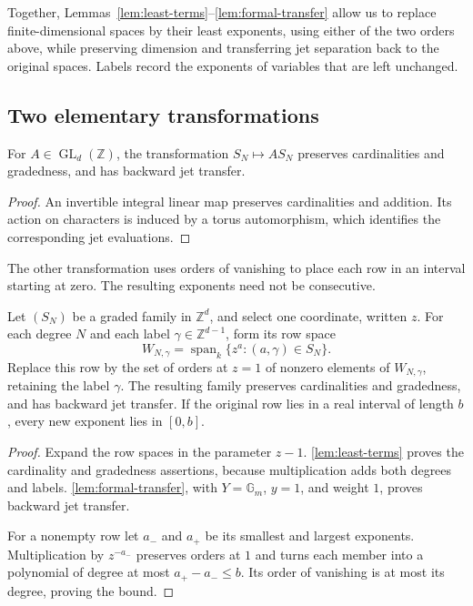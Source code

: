 Together, Lemmas~\ref{lem:least-terms}--\ref{lem:formal-transfer} allow us to replace finite-dimensional spaces by their least exponents, using either of the two orders above, while preserving dimension and transferring jet separation back to the original spaces.  Labels record the exponents of variables that are left unchanged.

\subsection{Two elementary transformations}

\begin{lemma}\label{lem:unimodular}
For $A\in\operatorname{GL}_d(\mathbb{Z})$, the transformation $S_N\mapsto A S_N$ preserves cardinalities and gradedness, and has backward jet transfer.
\end{lemma}

\begin{proof}
An invertible integral linear map preserves cardinalities and addition. Its action on characters is induced by a torus automorphism, which identifies the corresponding jet evaluations.
\end{proof}

The other transformation uses orders of vanishing to place each row in an interval starting at zero.  The resulting exponents need not be consecutive.

\begin{lemma}\label{lem:compression}
Let $(S_N)$ be a graded family in $\mathbb{Z}^d$, and select one coordinate, written $z$.  For each degree $N$ and each label $\gamma\in\mathbb{Z}^{d-1}$, form its row space
\[
 W_{N,\gamma}
 =\operatorname{span}_k\{z^a:(a,\gamma)\in S_N\}.
\]
Replace this row by the set of orders at $z=1$ of nonzero elements of $W_{N,\gamma}$, retaining the label $\gamma$.  The resulting family preserves cardinalities and gradedness, and has backward jet transfer. If the original row lies in a real interval of length $b$, every new exponent lies in $[0,b]$.
\end{lemma}

\begin{proof}
Expand the row spaces in the parameter $z-1$.  \cref{lem:least-terms} proves the cardinality and gradedness assertions, because multiplication adds both degrees and labels.  \cref{lem:formal-transfer}, with $Y=\mathbb{G}_m$, $y=1$, and weight $1$, proves backward jet transfer.

For a nonempty row let $a_-$ and $a_+$ be its smallest and largest exponents.  Multiplication by $z^{-a_-}$ preserves orders at $1$ and turns each member into a polynomial of degree at most $a_+-a_-\leq b$. Its order of vanishing is at most its degree, proving the bound.
\end{proof}

